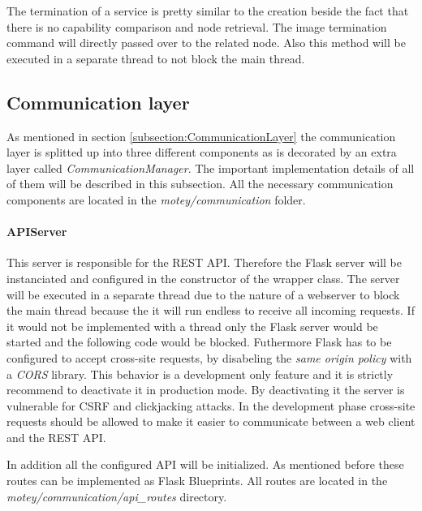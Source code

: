 The termination of a service is pretty similar to the creation beside the fact that there is no capability comparison and node retrieval.
The image termination command will directly passed over to the related node.
Also this method will be executed in a separate thread to not block the main thread.

\subsection{Communication layer}
\label{subsection:implementation-communication-layer}
As mentioned in section \ref{subsection:CommunicationLayer} the communication layer is splitted up into three different components as is decorated by an extra layer called \textit{CommunicationManager}.
The important implementation details of all of them will be described in this subsection.
All the necessary communication components are located in the \textit{motey/communication} folder.

\paragraph{APIServer} This server is responsible for the \ac{REST} \ac{API}.
Therefore the Flask server will be instanciated and configured in the constructor of the wrapper class.
The server will be executed in a separate thread due to the nature of a webserver to block the main thread because the it will run endless to receive all incoming requests.
If it would not be implemented with a thread only the Flask server would be started and the following code would be blocked.
Futhermore Flask has to be configured to accept cross-site requests, by disabeling the \textit{same origin policy} with a \textit{\ac{CORS}} library.
This behavior is a development only feature and it is strictly recommend to deactivate it in production mode.
By deactivating it the server is vulnerable for \ac{CSRF} and clickjacking attacks.
In the development phase cross-site requests should be allowed to make it easier to communicate between a web client and the \ac{REST} \ac{API}.

In addition all the configured \ac{API} will be initialized.
As mentioned before these routes can be implemented as Flask Blueprints.
All routes are located in the \textit{motey/communication/api\_routes} directory.

